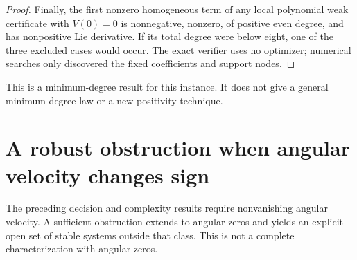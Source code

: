 \documentclass[11pt,a4paper]{article}
\theoremstyle{remark}\newtheorem{remark}[theorem]{Remark}
\begin{document}
\begin{proof}
Finally, the first nonzero homogeneous term of any local polynomial
weak certificate with \(V(0)=0\) is nonnegative, nonzero, of positive
even degree, and has nonpositive Lie derivative. If its total degree
were below eight, one of the three excluded cases would occur.
The exact verifier uses no optimizer; numerical searches only discovered
the fixed coefficients and support nodes.
\end{proof}

This is a minimum-degree result for this instance. It does not give
a general minimum-degree law or a new positivity technique.

\section{A robust obstruction when angular velocity changes sign}
The preceding decision and complexity results require nonvanishing
angular velocity. A sufficient obstruction extends to angular zeros
and yields an explicit open set of stable systems outside that class.
This is not a complete characterization with angular zeros.
\end{document}
